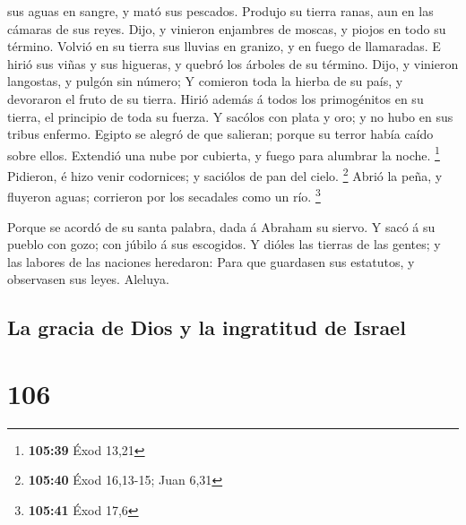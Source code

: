 sus aguas en sangre, y mató sus pescados.  Produjo su
tierra ranas, aun en las cámaras de sus reyes.  Dijo, y
vinieron enjambres de moscas, y piojos en todo su término. 
Volvió en su tierra sus lluvias en granizo, y en fuego de llamaradas.
 E hirió sus viñas y sus higueras, y quebró los árboles de
su término.  Dijo, y vinieron langostas, y pulgón sin
número;  Y comieron toda la hierba de su país, y devoraron
el fruto de su tierra.  Hirió además á todos los
primogénitos en su tierra, el principio de toda su fuerza. 
Y sacólos con plata y oro; y no hubo en sus tribus enfermo.
 Egipto se alegró de que salieran; porque su terror había
caído sobre ellos.  Extendió una nube por cubierta, y fuego
para alumbrar la noche. \footnote{\textbf{105:39} Éxod 13,21}
 Pidieron, é hizo venir codornices; y saciólos de pan del
cielo. \footnote{\textbf{105:40} Éxod 16,13-15; Juan 6,31} 
Abrió la peña, y fluyeron aguas; corrieron por los secadales como un
río. \footnote{\textbf{105:41} Éxod 17,6}

 Porque se acordó de su santa palabra, dada á Abraham su
siervo.  Y sacó á su pueblo con gozo; con júbilo á sus
escogidos.  Y dióles las tierras de las gentes; y las
labores de las naciones heredaron:  Para que guardasen sus
estatutos, y observasen sus leyes. Aleluya.

\hypertarget{la-gracia-de-dios-y-la-ingratitud-de-israel}{%
\subsection{La gracia de Dios y la ingratitud de
Israel}\label{la-gracia-de-dios-y-la-ingratitud-de-israel}}

\hypertarget{section-105}{%
\section{106}\label{section-105}}

